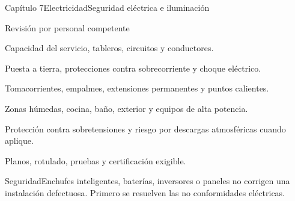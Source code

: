 \documentclass{../plantilla/hvtbook}
\begin{document}
\begin{HVTPage}{Capítulo 7}{Electricidad}{Seguridad eléctrica e iluminación}
\begin{HVTTask}{Revisión por personal competente}\item Capacidad del servicio, tableros, circuitos y conductores. \item Puesta a tierra, protecciones contra sobrecorriente y choque eléctrico. \item Tomacorrientes, empalmes, extensiones permanentes y puntos calientes. \item Zonas húmedas, cocina, baño, exterior y equipos de alta potencia. \item Protección contra sobretensiones y riesgo por descargas atmosféricas cuando aplique. \item Planos, rotulado, pruebas y certificación exigible.\end{HVTTask}
\begin{HVTWarning}{Seguridad}Enchufes inteligentes, baterías, inversores o paneles no corrigen una instalación defectuosa. Primero se resuelven las no conformidades eléctricas.\end{HVTWarning}
\end{HVTPage}
\end{document}
